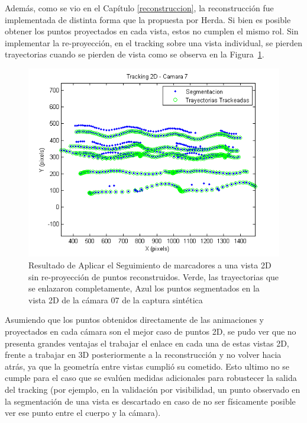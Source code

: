 Además, como se vio en el Capítulo \ref{reconstruccion}, la reconstrucción fue implementada de distinta forma que la propuesta por Herda. Si bien es posible obtener los puntos proyectados en cada vista, estos no cumplen el mismo rol. Sin implementar la re-proyección, en el tracking sobre una vista individual, se pierden trayectorias cuando se pierden de vista como se observa en la Figura~\ref{tracking_2D_cam_07}.
\vspace{-0.2cm}
\begin{figure}[ht!]
\begin{center}
\includegraphics[scale=0.7]{img/Tracking/011_tracking_2D_camara_07.png}
\end{center}
\vspace{-0.8cm}
\caption{Resultado de Aplicar el Seguimiento de marcadores a una vista 2D sin re-proyección de puntos reconstruidos. Verde, las trayectorias que se enlazaron completamente, Azul los puntos segmentados en la vista 2D de la cámara 07 de la captura sintética}
\label{tracking_2D_cam_07}
\end{figure}

Asumiendo que los puntos obtenidos directamente de las animaciones y proyectados en cada cámara son el mejor caso de puntos 2D, se pudo ver que no presenta grandes ventajas el trabajar el enlace en cada una de estas vistas 2D, frente a trabajar en 3D posteriormente a la reconstrucción y no volver hacia atrás, ya que la geometría entre vistas cumplió su cometido. Esto ultimo no se cumple para el caso que se evalúen medidas adicionales para robustecer la salida del tracking (por ejemplo, en la validación por visibilidad, un punto observado en la segmentación de una vista es descartado en caso de no ser físicamente posible ver ese punto entre el cuerpo y la cámara).

